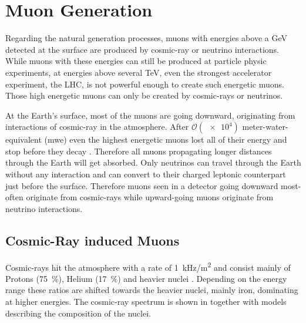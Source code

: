 \chapter{Muon Generation} \label{sec:generation}

Regarding the natural generation processes, muons with energies above a GeV detected at the surface are produced by cosmic-ray or neutrino interactions.
While muons with these energies can still be produced at particle physic experiments, at energies above several TeV, even the strongest accelerator experiment, the LHC, is not powerful enough to create such energetic muons.
Those high energetic muons can only be created by cosmic-rays or neutrinos.

At the Earth's surface, most of the muons are going downward, originating from interactions of cosmic-ray in the atmosphere.
After $\mathcal{O}(\num{e4})$ meter-water-equivalent (mwe) even the highest energetic muons lost all of their energy and stop before they decay \cite{PDG20}.
Therefore all muons propagating longer distances through the Earth will get absorbed.
Only neutrinos can travel through the Earth without any interaction and can convert to their charged leptonic counterpart just before the surface.
Therefore muons seen in a detector going downward most-often originate from cosmic-rays while upward-going muons originate from neutrino interactions.

\section{Cosmic-Ray induced Muons}

Cosmic-rays hit the atmosphere with a rate of \SI{1}{kHz/m^2} and consist mainly of Protons (\SI{75}{\percent}), Helium (\SI{17}{\percent}) and heavier nuclei \cite{Gaisser16CR}.
Depending on the energy range these ratios are shifted towards the heavier nuclei, mainly iron, dominating at higher energies.
The cosmic-ray spectrum is shown in  together with models describing the composition of the nuclei.

